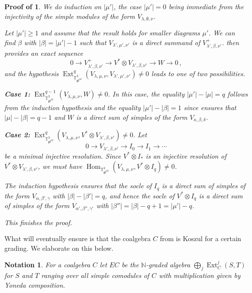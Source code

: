 \documentclass[11pt]{article}
\theoremstyle{plain}
\theoremstyle{nonumberplain}
\theoremstyle{plain}
\newtheorem{notation}[lemma]{Notation}
\theoremstyle{nonumberplain}
\newtheorem{proof_of_Kosz}{Proof of \Cref{th.Kosz}}
\newcommand\bN{{\mathbb N}}
\newcommand\bT{{\mathbb T}}
\newcommand\fgl{\mathfrak{gl}}
\DeclareMathOperator{\Hom}{\mathrm{Hom}}
\DeclareMathOperator{\Ext}{\mathrm{Ext}}
\begin{document}
\begin{proof_of_Kosz}
We do induction on $|\mu'|$, the case $|\mu'|=0$ being immediate from the injectivity of the simple modules of the form $V_{\lambda,\emptyset,\nu}$. 

Let $|\mu'|\ge 1$ and assume that the result holds for smaller diagrams $\mu'$. We can find $\beta$ with $|\beta|=|\mu'|-1$ such that $V_{\lambda',\mu',\nu'}$ is a direct summand of $V_{\lambda',\beta,\nu'}^+$.  then provides an exact sequence
\begin{equation*}
    0\to V_{\lambda',\beta,\nu'}^+\to V^*\otimes V_{\lambda',\beta,\nu'}\to W\to 0\,,
\end{equation*}
 and the hypothesis $\Ext^q_{\bT^3_{\fgl^M}}(V_{\lambda,\mu,\nu},
V_{\lambda',\mu',\nu'})\ne 0$ leads to one of two possibilities. 

{\bf Case 1: }$\Ext^{q-1}_{\bT^3_{\fgl^M}}(V_{\lambda,\mu,\nu},
W)\ne 0$.  In this case, the equality $|\mu'|-|\mu|=q$ follows from the induction hypothesis and the equality $|\mu'|-|\beta|=1$ since  ensures that $|\mu|-|\beta|=q-1$ and $W$ is a direct sum of simples of the form $V_{\kappa,\beta,\delta}$.

{\bf Case 2: }$\Ext^q_{\bT^3_{\fgl^M}}(V_{\lambda,\mu,\nu},
V^*\otimes V_{\lambda',\beta,\nu'})\ne 0$. Let 
\begin{equation*}
  0\to V_{\lambda',\beta,\nu'}\to I_0\to I_1\to\cdots
\end{equation*}
be a minimal injective resolution. Since $V^*\otimes I_*$ is an injective resolution of $V^*\otimes V_{\lambda',\beta,\nu'}$, we must have $\Hom_{\bT^3_{\fgl^M}}(V_{\lambda,\mu,\nu},V^*\otimes I_q)\ne 0$. 

The induction hypothesis ensures that the socle of $I_q$ is a direct sum of simples of the form $V_{\alpha,\beta',\gamma}$ with $|\beta|-|\beta'|=q$, and hence the socle of $V^*\otimes I_q$ is a direct sum of simples of the form $V_{\alpha',\beta'',\gamma'}$ with $|\beta''| = |\beta|-q+1 = |\mu'|-q$.    

This finishes the proof. 
\end{proof_of_Kosz}






What  will eventually ensure is that the coalgebra $C$
from  is Koszul for a certain grading. We elaborate
on this below. 



\begin{notation}\label{not.EC}
For a coalgebra $C$ let $EC$ be the $\bN$-graded algebra $\bigoplus_{j}
\Ext^j_{C}(S,T)$ for $S$ and $T$ ranging over all simple comodules of
$C$ with multiplication given by Yoneda composition.   
\end{notation}
\end{document}
